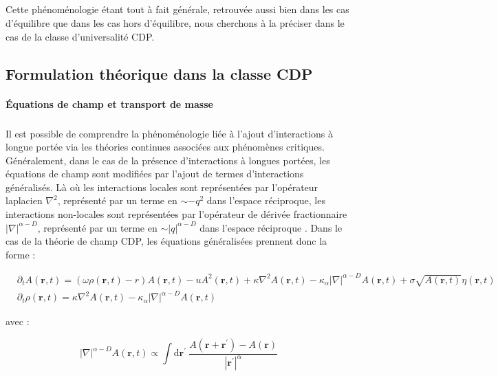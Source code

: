 \subparagraph{}Cette phénoménologie étant tout à fait générale, retrouvée aussi bien dans les cas d'équilibre que dans les cas hors d'équilibre, nous cherchons à la préciser dans le cas de la classe d'universalité CDP.

\subsection{Formulation théorique dans la classe CDP}

\paragraph{Équations de champ et transport de masse}

\subparagraph{}Il est possible de comprendre la phénoménologie liée à l'ajout d'interactions à longue portée via les théories continues associées aux phénomènes critiques. Généralement, dans le cas de la présence d'interactions à longues portées, les équations de champ sont modifiées par l'ajout de termes d'interactions généralisés. Là où les interactions locales sont représentées par l'opérateur laplacien $\nabla^2$, représenté par un terme en $\sim -q^2$ dans l'espace réciproque, les interactions non-locales sont représentées par l'opérateur de dérivée fractionnaire $|\nabla|^{\alpha-D}$, représenté par un terme en $\sim |q|^{\alpha-D}$ dans l'espace réciproque \cite{hinrichsen_non_equilibrium_2007}. Dans le cas de la théorie de champ CDP, les équations généralisées prennent donc la forme :

\begin{equation}
\begin{aligned}
	&\partial_t A(\mathbf{r}, t) = (\omega\rho (\mathbf{r}, t) - r)A(\mathbf{r}, t) - uA^2(\mathbf{r}, t) + \kappa\nabla^2 A (\mathbf{r}, t) - \kappa_\alpha|\nabla|^{\alpha-D} A (\mathbf{r}, t) + \sigma \sqrt{A(\mathbf{r}, t)} \eta(\mathbf{r}, t)\\
	&\partial_t \rho (\mathbf{r}, t) = \kappa\nabla^2 A (\mathbf{r}, t)- \kappa_\alpha|\nabla|^{\alpha-D} A (\mathbf{r}, t)
\end{aligned}
\label{eq:LRCDP}
\end{equation}

\noindent avec :

\begin{equation}
	|\nabla|^{\alpha-D} A (\mathbf{r}, t) \propto \int \mathrm{d}\mathbf{r}^\prime ~ \frac{A(\mathbf{r}+\mathbf{r}^\prime)-A(\mathbf{r})}{|\mathbf{r}^{\prime}|^{\alpha}}
\end{equation}

